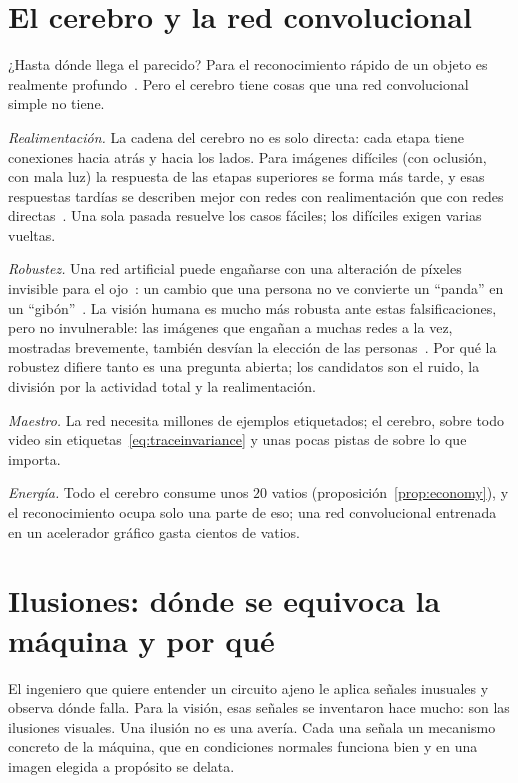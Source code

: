 \section{El cerebro y la red convolucional}

¿Hasta dónde llega el parecido? Para el reconocimiento rápido de un objeto es realmente profundo~\cite{Yamins2014}. Pero el cerebro tiene cosas que una red convolucional simple no tiene.

\emph{Realimentación.} La cadena del cerebro no es solo directa: cada etapa tiene conexiones hacia atrás y hacia los lados. Para imágenes difíciles (con oclusión, con mala luz) la respuesta de las etapas superiores se forma más tarde, y esas respuestas tardías se describen mejor con redes con realimentación que con redes directas~\cite{Kar2019}. Una sola pasada resuelve los casos fáciles; los difíciles exigen varias vueltas.

\emph{Robustez.} Una red artificial puede engañarse con una alteración de píxeles invisible para el ojo~\cite{Szegedy2014}: un cambio que una persona no ve convierte un “panda” en un “gibón”~\cite{Goodfellow2015}. La visión humana es mucho más robusta ante estas falsificaciones, pero no invulnerable: las imágenes que engañan a muchas redes a la vez, mostradas brevemente, también desvían la elección de las personas~\cite{Elsayed2018}. Por qué la robustez difiere tanto es una pregunta abierta; los candidatos son el ruido, la división por la actividad total y la realimentación.

\emph{Maestro.} La red necesita millones de ejemplos etiquetados; el cerebro, sobre todo video sin etiquetas~\eqref{eq:traceinvariance} y unas pocas pistas de  sobre lo que importa.

\emph{Energía.} Todo el cerebro consume unos $20$ vatios (proposición~\ref{prop:economy}), y el reconocimiento ocupa solo una parte de eso; una red convolucional entrenada en un acelerador gráfico gasta cientos de vatios.

\section{Ilusiones: dónde se equivoca la máquina y por qué}
\label{sec:illusions}

El ingeniero que quiere entender un circuito ajeno le aplica señales inusuales y observa dónde falla. Para la visión, esas señales se inventaron hace mucho: son las ilusiones visuales. Una ilusión no es una avería. Cada una señala un mecanismo concreto de la máquina, que en condiciones normales funciona bien y en una imagen elegida a propósito se delata.

